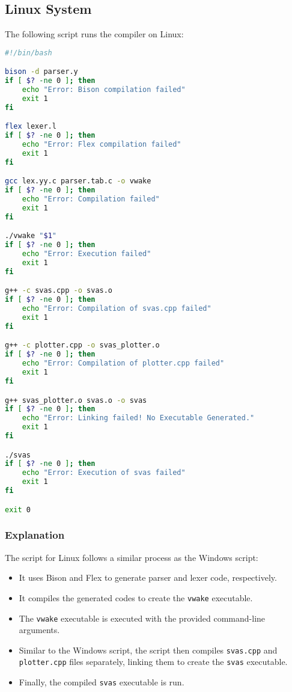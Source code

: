 \documentclass{article}
\begin{document}
\subsection{Linux System}

The following script runs the compiler on Linux:

\begin{lstlisting}[language=bash]
#!/bin/bash

bison -d parser.y
if [ $? -ne 0 ]; then
    echo "Error: Bison compilation failed"
    exit 1
fi

flex lexer.l
if [ $? -ne 0 ]; then
    echo "Error: Flex compilation failed"
    exit 1
fi

gcc lex.yy.c parser.tab.c -o vwake
if [ $? -ne 0 ]; then
    echo "Error: Compilation failed"
    exit 1
fi

./vwake "$1"
if [ $? -ne 0 ]; then
    echo "Error: Execution failed"
    exit 1
fi

g++ -c svas.cpp -o svas.o
if [ $? -ne 0 ]; then
    echo "Error: Compilation of svas.cpp failed"
    exit 1
fi

g++ -c plotter.cpp -o svas_plotter.o
if [ $? -ne 0 ]; then
    echo "Error: Compilation of plotter.cpp failed"
    exit 1
fi

g++ svas_plotter.o svas.o -o svas
if [ $? -ne 0 ]; then
    echo "Error: Linking failed! No Executable Generated."
    exit 1
fi

./svas
if [ $? -ne 0 ]; then
    echo "Error: Execution of svas failed"
    exit 1
fi

exit 0
\end{lstlisting}

\subsubsection{Explanation}
The script for Linux follows a similar process as the Windows script:
\begin{itemize}
    \item It uses Bison and Flex to generate parser and lexer code, respectively.
    \item It compiles the generated codes to create the \texttt{vwake} executable.
    \item The \texttt{vwake} executable is executed with the provided command-line arguments.
    \item Similar to the Windows script, the script then compiles \texttt{svas.cpp} and \texttt{plotter.cpp} files separately, linking them to create the \texttt{svas} executable.
    \item Finally, the compiled \texttt{svas} executable is run.
\end{itemize}
\end{document}
